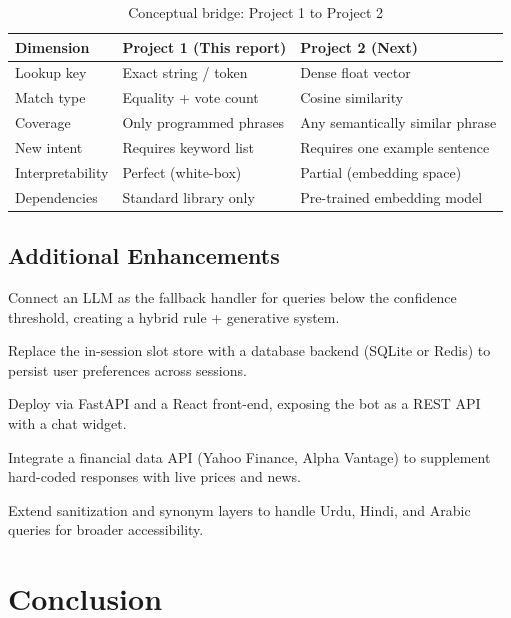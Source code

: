 \documentclass[12pt, a4paper]{article}
\begin{document}
\begin{table}[ht]
\centering
\caption{Conceptual bridge: Project 1 to Project 2}
\begin{tabularx}{\linewidth}{l X X}
\toprule
\rowcolor{tabh!12}
Dimension & Project 1 (This report) & Project 2 (Next) \\
\midrule
Lookup key     & Exact string / token & Dense float vector \\
Match type     & Equality + vote count & Cosine similarity \\
Coverage       & Only programmed phrases & Any semantically similar phrase \\
New intent     & Requires keyword list & Requires one example sentence \\
Interpretability & Perfect (white-box) & Partial (embedding space) \\
Dependencies   & Standard library only & Pre-trained embedding model \\
\bottomrule
\end{tabularx}
\end{table}

\subsection{Additional Enhancements}

\begin{description}[noitemsep]
  \item[LLM Hybrid Integration] Connect an LLM as the fallback handler for
  queries below the confidence threshold, creating a hybrid rule + generative system.
  \item[Persistent Memory] Replace the in-session slot store with a database
  backend (SQLite or Redis) to persist user preferences across sessions.
  \item[Web Interface] Deploy via FastAPI and a React front-end, exposing the
  bot as a REST API with a chat widget.
  \item[Real-Time Market Data] Integrate a financial data API (Yahoo Finance,
  Alpha Vantage) to supplement hard-coded responses with live prices and news.
  \item[Multi-language Support] Extend sanitization and synonym layers to handle
  Urdu, Hindi, and Arabic queries for broader accessibility.
\end{description}

\section{Conclusion}
\end{document}

